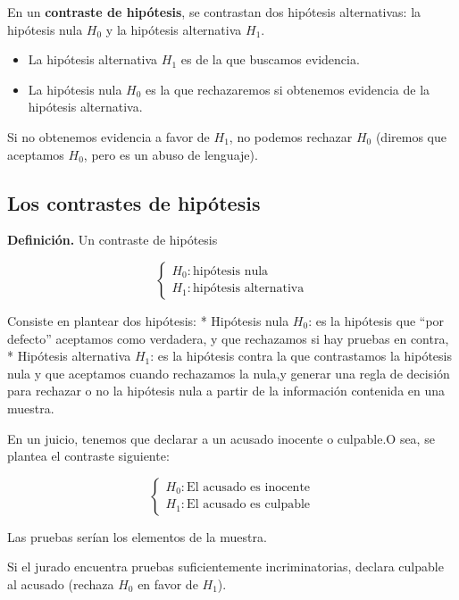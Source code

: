 \documentclass[
]{article}
\providecommand{\tightlist}{%
  \setlength{\itemsep}{0pt}\setlength{\parskip}{0pt}}
\begin{document}
En un \textbf{contraste de hipótesis}, se contrastan dos hipótesis
alternativas: la hipótesis nula \(H_0\) y la hipótesis alternativa
\(H_1\).

\begin{itemize}
\tightlist
\item
  La hipótesis alternativa \(H_1\) es de la que buscamos evidencia.
\item
  La hipótesis nula \(H_0\) es la que rechazaremos si obtenemos
  evidencia de la hipótesis alternativa.
\end{itemize}

Si no obtenemos evidencia a favor de \(H_1\), no podemos rechazar
\(H_0\) (diremos que aceptamos \(H_0\), pero es un abuso de lenguaje).

\hypertarget{los-contrastes-de-hipuxf3tesis}{%
\subsection{Los contrastes de
hipótesis}\label{los-contrastes-de-hipuxf3tesis}}

\textbf{Definición.} Un contraste de hipótesis

\[\begin{cases}
H_0: \text{hipótesis nula} \\
H_1: \text{hipótesis alternativa} 
\end{cases}\]

Consiste en plantear dos hipótesis: * Hipótesis nula \(H_0\): es la
hipótesis que ``por defecto'' aceptamos como verdadera, y que rechazamos
si hay pruebas en contra, * Hipótesis alternativa \(H_1\): es la
hipótesis contra la que contrastamos la hipótesis nula y que aceptamos
cuando rechazamos la nula,y generar una regla de decisión para rechazar
o no la hipótesis nula a partir de la información contenida en una
muestra.

En un juicio, tenemos que declarar a un acusado inocente o culpable.O
sea, se plantea el contraste siguiente:

\[\begin{cases}
H_0: \text{El acusado es inocente} \\
H_1: \text{El acusado es culpable} 
\end{cases}\]

Las pruebas serían los elementos de la muestra.

Si el jurado encuentra pruebas suficientemente incriminatorias, declara
culpable al acusado (rechaza \(H_0\) en favor de \(H_1\)).
\end{document}
